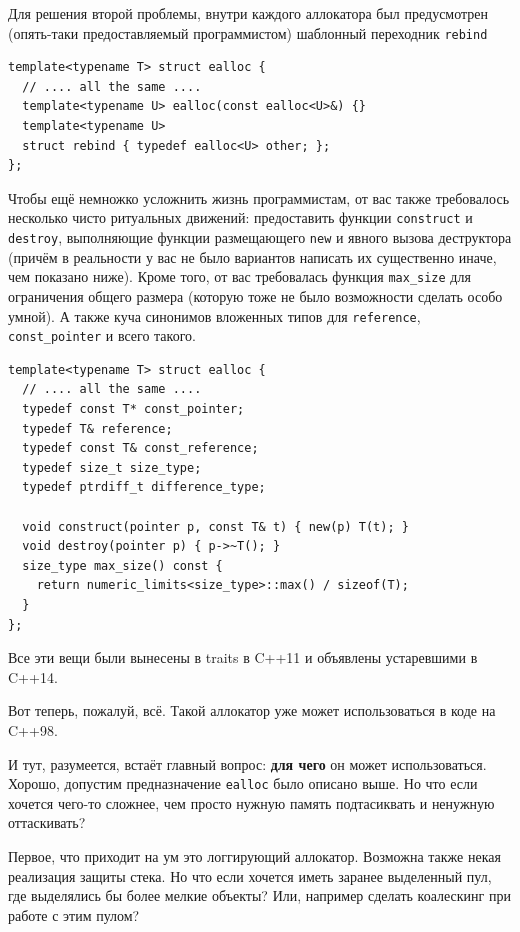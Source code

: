 \documentclass[a4paper,12pt,oneside]{book}
\begin{document}
Для решения второй проблемы, внутри каждого аллокатора был предусмотрен (опять-таки предоставляемый программистом) шаблонный переходник \lstinline!rebind!

\begin{lstlisting}
template<typename T> struct ealloc {
  // .... all the same ....
  template<typename U> ealloc(const ealloc<U>&) {}
  template<typename U>
  struct rebind { typedef ealloc<U> other; };
};
\end{lstlisting}

Чтобы ещё немножко усложнить жизнь программистам, от вас также требовалось несколько чисто ритуальных движений: предоставить функции \lstinline!construct! и \lstinline!destroy!, выполняющие функции размещающего \lstinline!new! и явного вызова деструктора (причём в реальности у вас не было вариантов написать их существенно иначе, чем показано ниже). Кроме того, от вас требовалась функция \lstinline!max_size! для ограничения общего размера (которую тоже не было возможности сделать особо умной). А также куча синонимов вложенных типов для \lstinline!reference!, \lstinline!const_pointer! и всего такого.

\begin{lstlisting}
template<typename T> struct ealloc {
  // .... all the same ....
  typedef const T* const_pointer;
  typedef T& reference;
  typedef const T& const_reference;
  typedef size_t size_type;
  typedef ptrdiff_t difference_type;

  void construct(pointer p, const T& t) { new(p) T(t); }
  void destroy(pointer p) { p->~T(); }
  size_type max_size() const {
    return numeric_limits<size_type>::max() / sizeof(T);
  }
};
\end{lstlisting}

Все эти вещи были вынесены в traits в C++11 и объявлены устаревшими в C++14.

Вот теперь, пожалуй, всё. Такой аллокатор уже может использоваться в коде на C++98.

И тут, разумеется, встаёт главный вопрос: \textbf{для чего} он может использоваться. Хорошо, допустим предназначение \lstinline!ealloc! было описано выше. Но что если хочется чего-то сложнее, чем просто нужную память подтасиквать и ненужную оттаскивать?

Первое, что приходит на ум это логгирующий аллокатор. Возможна также некая реализация защиты стека. Но что если хочется иметь заранее выделенный пул, где выделялись бы более мелкие объекты? Или, например сделать коалескинг при работе с этим пулом?
\end{document}
